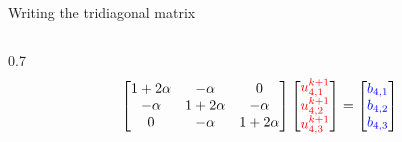 \documentclass{beamer}
\begin{document}
\begin{frame}{Writing the tridiagonal matrix}
\begin{columns}
\begin{column}{0.7\textwidth}
{\begin{align*}
\begin{bmatrix}
                        1 + 2\alpha & -\alpha & 0  \\
                         -\alpha & 1 + 2\alpha & -\alpha   \\
                        0 & -\alpha & 1 + 2\alpha\\
                    \end{bmatrix}
                    \begin{bmatrix}
                        \textcolor{red}{u_{4,1}^{k+1}} \\
                        \textcolor{red}{u_{4,2}^{k+1}} \\
                        \textcolor{red}{u_{4,3}^{k+1}} \\
                    \end{bmatrix}
                    =
                    \begin{bmatrix}
                        \textcolor{blue}{b_{4,1}} \\
                        \textcolor{blue}{b_{4,2}} \\
                        \textcolor{blue}{b_{4,3}} \\
                    \end{bmatrix}
                \end{align*}
                }
                \vspace{-1.5cm}
        \end{column}
    \end{columns}
   
    \vspace{0.1cm}
    \small
\end{frame}
\end{document}
